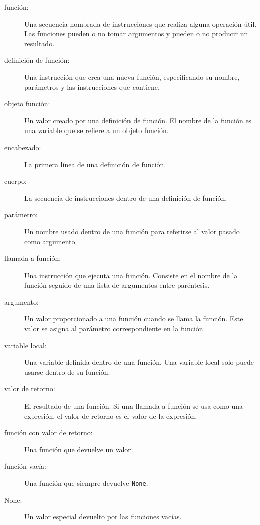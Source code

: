 \begin{description}
\item[función:] Una secuencia nombrada de instrucciones que realiza alguna operación útil. Las funciones pueden o no tomar argumentos y pueden o no producir un resultado.

\item[definición de función:] Una instrucción que crea una nueva función, especificando su nombre, parámetros y las instrucciones que contiene.

\item[objeto función:] Un valor creado por una definición de función. El nombre de la función es una variable que se refiere a un objeto función.

\item[encabezado:] La primera línea de una definición de función.

\item[cuerpo:] La secuencia de instrucciones dentro de una definición de función.

\item[parámetro:] Un nombre usado dentro de una función para referirse al valor pasado como argumento.

\item[llamada a función:] Una instrucción que ejecuta una función. Consiste en el nombre de la función seguido de una lista de argumentos entre paréntesis.

\item[argumento:] Un valor proporcionado a una función cuando se llama la función. Este valor se asigna al parámetro correspondiente en la función.

\item[variable local:] Una variable definida dentro de una función. Una variable local solo puede usarse dentro de su función.

\item[valor de retorno:] El resultado de una función. Si una llamada a función se usa como una expresión, el valor de retorno es el valor de la expresión.

\item[función con valor de retorno:] Una función que devuelve un valor.

\item[función vacía:] Una función que siempre devuelve \texttt{None}.

\item[None:] Un valor especial devuelto por las funciones vacías.


\end{description}
